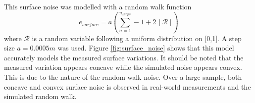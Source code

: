 		This surface noise was modelled with a random walk function
		\begin{equation}
			e_{surface} = a \left(\sum_{n = 1}^{n_{Steps}}-1 + 2\:\left \lfloor{\mathcal{R}}\right \rfloor \right)
		\end{equation} 
		where $\mathcal{R}$ is a random variable following a uniform distribution on [0,1]. A step size $a = 0.0005m$ was used. Figure \ref{fig:surface_noise} shows that this model accurately models the measured surface variations. It should be noted that the measured variation appears concave while the simulated noise appears convex. This is due to the nature of the random walk noise. Over a large sample, both concave and convex surface noise is observed in real-world measurements and the simulated random walk.

		\begin{figure}
	  		\centering
\end{figure}
